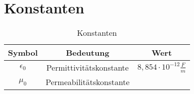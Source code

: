 \section{Konstanten}
\begin{table}[!htb]
    \centering
    \begin{tabular}{|c|c|c|}
        \hline
        \textbf{Symbol} & \textbf{Bedeutung}        & \textbf{Wert}                     \\ \hline
        $\epsilon_0$    & Permittivitätskonstante   & $8,854\cdot10^{-12}\frac{F}{m}$   \\
        $\mu_0$         & Permeabilitätskonstante   &                                   \\ \hline
    \end{tabular}
    \caption{Konstanten}
    \label{Grundkonzepte/Konstanten/Tabelle}
\end{table}

\pagebreak
